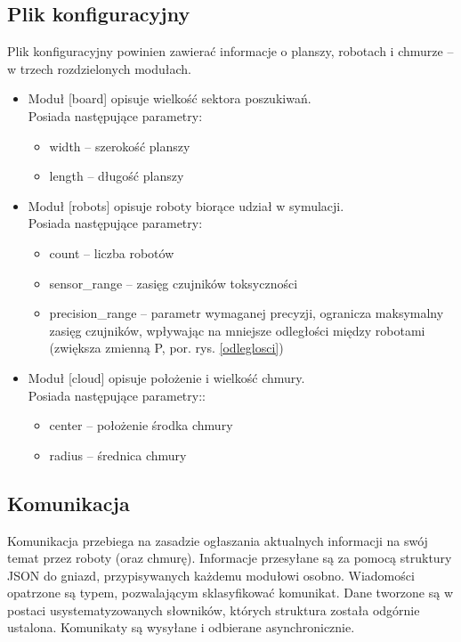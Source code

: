 \documentclass[a4paper, 12pt]{article}
\begin{document}
	\subsection{Plik konfiguracyjny}
	Plik konfiguracyjny powinien zawierać informacje o planszy, robotach i chmurze -- w trzech rozdzielonych modułach.
	\begin{itemize}
	\item Moduł [board] opisuje wielkość sektora poszukiwań.\\
		Posiada następujące parametry:
	\begin{itemize}
	\item width -- szerokość planszy
	\item length -- długość planszy
	\end{itemize}
	\item Moduł [robots] opisuje roboty biorące udział w symulacji.\\
		Posiada następujące parametry:
	\begin{itemize}
	\item count -- liczba robotów
	\item sensor\_range -- zasięg czujników toksyczności
	\item precision\_range -- parametr wymaganej precyzji, ogranicza maksymalny zasięg czujników, wpływając na mniejsze odległości między robotami (zwiększa zmienną P, por. rys. \ref{odleglosci})
	\end{itemize}
	\item Moduł [cloud] opisuje położenie i wielkość chmury.\\
		Posiada następujące parametry::
	\begin{itemize}
	\item center -- położenie środka chmury
	\item radius -- średnica chmury
	\end{itemize}
	\end{itemize}
	
	\subsection{Komunikacja}
	Komunikacja przebiega na zasadzie ogłaszania aktualnych informacji na swój temat przez roboty (oraz chmurę). Informacje przesyłane są za pomocą struktury JSON do gniazd, przypisywanych każdemu modułowi osobno.
	Wiadomości opatrzone są typem, pozwalającym sklasyfikować komunikat. Dane tworzone są w postaci usystematyzowanych słowników, których struktura została odgórnie ustalona.
	Komunikaty są wysyłane i odbierane asynchronicznie.
\end{document}
